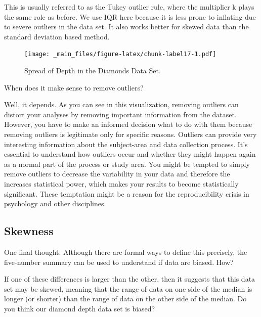 \documentclass[
]{book}
\newenvironment{Shaded}{\begin{snugshade}}{\end{snugshade}}
\newcommand{\CommentTok}[1]{\textcolor[rgb]{0.56,0.35,0.01}{\textit{#1}}}
\newcommand{\FunctionTok}[1]{\textcolor[rgb]{0.00,0.00,0.00}{#1}}
\newcommand{\NormalTok}[1]{#1}
\newcommand{\SpecialCharTok}[1]{\textcolor[rgb]{0.00,0.00,0.00}{#1}}
\begin{document}
This is usually referred to as the Tukey outlier rule, where the multiplier k plays the same role as before. We use IQR here because it is less prone to inflating due to severe outliers in the data set. It also works better for skewed data than the standard deviation based method.

\begin{figure}
\centering
\texttt{[image: \_main\_files/figure-latex/chunk-label17-1.pdf]}
\caption{\label{fig:chunk-label17}Spread of Depth in the Diamonds Data Set.}
\end{figure}

When does it make sense to remove outliers?

Well, it depends. As you can see in this visualization, removing outliers can distort your analyses by removing important information from the dataset. However, you have to make an informed decision what to do with them because removing outliers is legitimate only for specific reasons. Outliers can provide very interesting information about the subject-area and data collection process. It's essential to understand how outliers occur and whether they might happen again as a normal part of the process or study area. You might be tempted to simply remove outliers to decrease the variability in your data and therefore the increases statistical power, which makes your results to become statistically significant. These temptation might be a reason for the reproducibility crisis in psychology and other disciplines.

\hypertarget{skewness}{%
\subsection{Skewness}\label{skewness}}

One final thought. Although there are formal ways to define this precisely, the five-number summary can be used to understand if data are biased. How?

If one of these differences is larger than the other, then it suggests that this data set may be skewed, meaning that the range of data on one side of the median is longer (or shorter) than the range of data on the other side of the median. Do you think our diamond depth data set is biased?

\begin{Shaded}
\end{Shaded}
\end{document}

